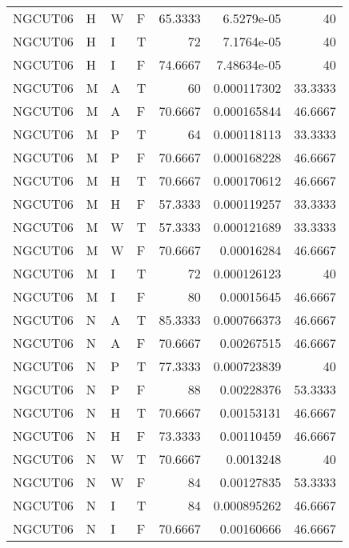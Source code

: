 \begin{table}[htb!]
{\begin{tabular}{llllrrr}
            NGCUT06  & H     & W     & F          & 65.3333    & 6.5279e-05  & 40       \\
            NGCUT06  & H     & I     & T          & 72         & 7.1764e-05  & 40       \\
            NGCUT06  & H     & I     & F          & 74.6667    & 7.48634e-05 & 40       \\
            NGCUT06  & M     & A     & T          & 60         & 0.000117302 & 33.3333  \\
            NGCUT06  & M     & A     & F          & 70.6667    & 0.000165844 & 46.6667  \\
            NGCUT06  & M     & P     & T          & 64         & 0.000118113 & 33.3333  \\
            NGCUT06  & M     & P     & F          & 70.6667    & 0.000168228 & 46.6667  \\
            NGCUT06  & M     & H     & T          & 70.6667    & 0.000170612 & 46.6667  \\
            NGCUT06  & M     & H     & F          & 57.3333    & 0.000119257 & 33.3333  \\
            NGCUT06  & M     & W     & T          & 57.3333    & 0.000121689 & 33.3333  \\
            NGCUT06  & M     & W     & F          & 70.6667    & 0.00016284  & 46.6667  \\
            NGCUT06  & M     & I     & T          & 72         & 0.000126123 & 40       \\
            NGCUT06  & M     & I     & F          & 80         & 0.00015645  & 46.6667  \\
            NGCUT06  & N     & A     & T          & 85.3333    & 0.000766373 & 46.6667  \\
            NGCUT06  & N     & A     & F          & 70.6667    & 0.00267515  & 46.6667  \\
            NGCUT06  & N     & P     & T          & 77.3333    & 0.000723839 & 40       \\
            NGCUT06  & N     & P     & F          & 88         & 0.00228376  & 53.3333  \\
            NGCUT06  & N     & H     & T          & 70.6667    & 0.00153131  & 46.6667  \\
            NGCUT06  & N     & H     & F          & 73.3333    & 0.00110459  & 46.6667  \\
            NGCUT06  & N     & W     & T          & 70.6667    & 0.0013248   & 40       \\
            NGCUT06  & N     & W     & F          & 84         & 0.00127835  & 53.3333  \\
            NGCUT06  & N     & I     & T          & 84         & 0.000895262 & 46.6667  \\
            NGCUT06  & N     & I     & F          & 70.6667    & 0.00160666  & 46.6667  \\
            \hline
        \end{tabular}
    }{
    }
\end{table} 
